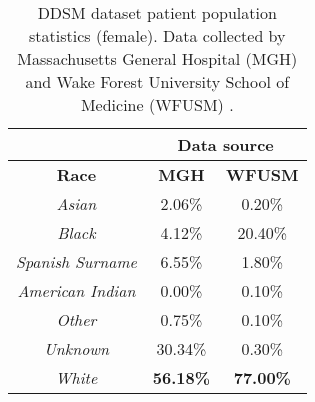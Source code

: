 \begin{table}[h]
\centering
\begin{tabular}{c|c|c|}
\cline{2-3}
\textbf{}                                      & \multicolumn{2}{c|}{\textbf{Data source}} \\ \hline
\multicolumn{1}{|c|}{\textbf{Race}}            & \textbf{MGH}       & \textbf{WFUSM}       \\ \hline
\multicolumn{1}{|c|}{\textit{Asian}}           & 2.06\%             & 0.20\%               \\ \hline
\multicolumn{1}{|c|}{\textit{Black}}           & 4.12\%             & 20.40\%              \\ \hline
\multicolumn{1}{|c|}{\textit{Spanish Surname}} & 6.55\%             & 1.80\%               \\ \hline
\multicolumn{1}{|c|}{\textit{American Indian}} & 0.00\%             & 0.10\%               \\ \hline
\multicolumn{1}{|c|}{\textit{Other}}           & 0.75\%             & 0.10\%               \\ \hline
\multicolumn{1}{|c|}{\textit{Unknown}}         & 30.34\%            & 0.30\%               \\ \hline
\multicolumn{1}{|c|}{\textit{White}}           & \textbf{56.18\%}            & \textbf{77.00\%}              \\ \hline
\end{tabular}
\caption{DDSM dataset patient population statistics (female). Data collected by Massachusetts General Hospital (MGH) and Wake Forest University School of Medicine (WFUSM) \citep{DDSMdataset2001}.}
\label{tab:conclusion-ddsm-patient-population}
\end{table}